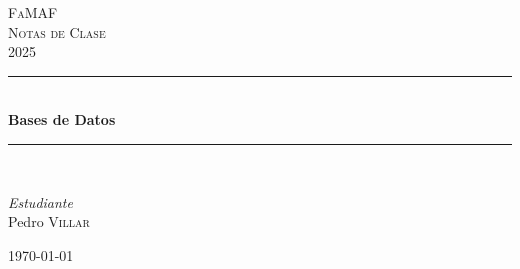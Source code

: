 \begin{titlepage} 
	\newcommand{\HRule}{\rule{\linewidth}{0.5mm}}
	
	\center 
	
	
	\textsc{\LARGE FaMAF}\\[1.5cm] 
	
	\textsc{\Large Notas de Clase}\\[0.5cm] 
	
	\textsc{\large 2025}\\[0.5cm] 
	
	
	\HRule\\[0.4cm]
	
	{\huge\bfseries Bases de Datos}\\[0.4cm] 
	
	\HRule\\[1.5cm]
	
	
	\begin{minipage}{0.4\textwidth}
		\begin{flushleft}
			\large
			\textit{Estudiante}\\
			Pedro \textsc{Villar} 
		\end{flushleft}
	\end{minipage}
	
	
	
	\vfill\vfill\vfill 
	
	{\large\today} 

	
	
	\vfill 
	
\end{titlepage}